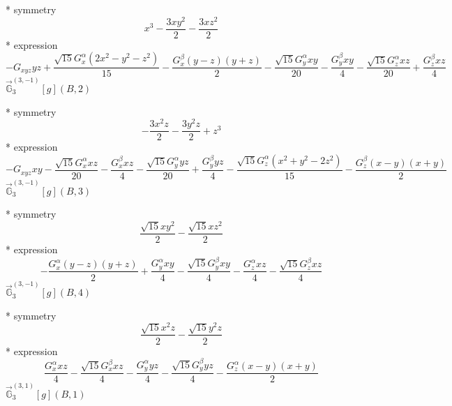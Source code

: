 \documentclass[fleqn,8pt]{jsarticle}
\begin{document}
\noindent\quad ** symmetry
\begin{dmath*}
x^{3} - \frac{3 x y^{2}}{2} - \frac{3 x z^{2}}{2}
\end{dmath*}
\noindent\quad ** expression
\begin{dmath*}
- G_{xyz} y z + \frac{\sqrt{15} G_{x}^{\alpha} \left(2 x^{2} - y^{2} - z^{2}\right)}{15} - \frac{G_{x}^{\beta} \left(y - z\right) \left(y + z\right)}{2} - \frac{\sqrt{15} G_{y}^{\alpha} x y}{20} - \frac{G_{y}^{\beta} x y}{4} - \frac{\sqrt{15} G_{z}^{\alpha} x z}{20} + \frac{G_{z}^{\beta} x z}{4}
\end{dmath*}
\noindent\quad $\vec{\mathbb{G}}_{3}^{(3,-1)}[g](B,2)$

\noindent\quad ** symmetry
\begin{dmath*}
- \frac{3 x^{2} z}{2} - \frac{3 y^{2} z}{2} + z^{3}
\end{dmath*}
\noindent\quad ** expression
\begin{dmath*}
- G_{xyz} x y - \frac{\sqrt{15} G_{x}^{\alpha} x z}{20} - \frac{G_{x}^{\beta} x z}{4} - \frac{\sqrt{15} G_{y}^{\alpha} y z}{20} + \frac{G_{y}^{\beta} y z}{4} - \frac{\sqrt{15} G_{z}^{\alpha} \left(x^{2} + y^{2} - 2 z^{2}\right)}{15} - \frac{G_{z}^{\beta} \left(x - y\right) \left(x + y\right)}{2}
\end{dmath*}
\noindent\quad $\vec{\mathbb{G}}_{3}^{(3,-1)}[g](B,3)$

\noindent\quad ** symmetry
\begin{dmath*}
\frac{\sqrt{15} x y^{2}}{2} - \frac{\sqrt{15} x z^{2}}{2}
\end{dmath*}
\noindent\quad ** expression
\begin{dmath*}
- \frac{G_{x}^{\alpha} \left(y - z\right) \left(y + z\right)}{2} + \frac{G_{y}^{\alpha} x y}{4} - \frac{\sqrt{15} G_{y}^{\beta} x y}{4} - \frac{G_{z}^{\alpha} x z}{4} - \frac{\sqrt{15} G_{z}^{\beta} x z}{4}
\end{dmath*}
\noindent\quad $\vec{\mathbb{G}}_{3}^{(3,-1)}[g](B,4)$

\noindent\quad ** symmetry
\begin{dmath*}
\frac{\sqrt{15} x^{2} z}{2} - \frac{\sqrt{15} y^{2} z}{2}
\end{dmath*}
\noindent\quad ** expression
\begin{dmath*}
\frac{G_{x}^{\alpha} x z}{4} - \frac{\sqrt{15} G_{x}^{\beta} x z}{4} - \frac{G_{y}^{\alpha} y z}{4} - \frac{\sqrt{15} G_{y}^{\beta} y z}{4} - \frac{G_{z}^{\alpha} \left(x - y\right) \left(x + y\right)}{2}
\end{dmath*}
\noindent\quad $\vec{\mathbb{G}}_{3}^{(3,1)}[g](B,1)$
\end{document}
